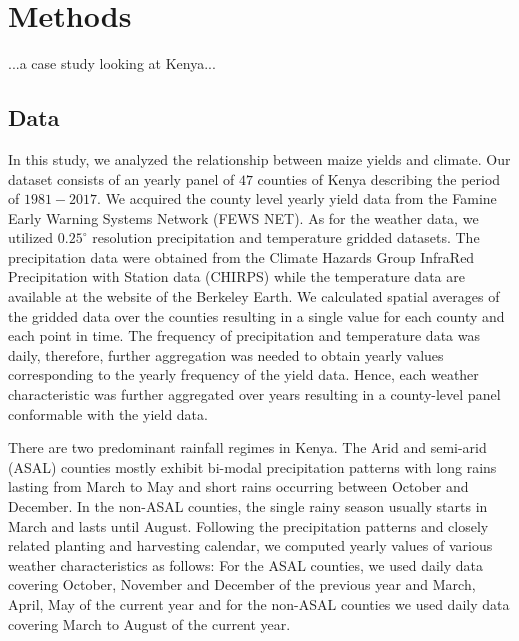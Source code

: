 \documentclass[12pt]{iopart}
\begin{document}
\section{Methods}\label{Methods}
\color{blue}

...a case study looking at Kenya...
\color{black}


 
\subsection{Data}\label{Data}

In this study, we analyzed the relationship between maize yields and climate. Our dataset consists of an yearly panel of $47$ counties of Kenya describing the period of $1981-2017$. 
	We acquired the county level yearly yield data from the Famine Early Warning Systems Network (FEWS NET). As for the weather data, we utilized $0.25^\circ$ resolution precipitation and temperature gridded datasets. The precipitation data were obtained from the Climate Hazards Group InfraRed Precipitation with Station data (CHIRPS) while the temperature data are available at the website of the Berkeley Earth. We calculated spatial averages of the gridded data over the counties resulting in a single value for each county and each point in time. The frequency of precipitation and temperature data was daily, therefore, further aggregation was needed to obtain yearly values corresponding to the yearly frequency of the yield data. Hence, each weather characteristic was further aggregated over years resulting in a county-level panel conformable with the yield data. 
	
	There are two predominant rainfall regimes in Kenya. The Arid and semi-arid (ASAL) counties mostly exhibit bi-modal precipitation patterns with long rains lasting from March to May and short rains occurring between October and December. In the non-ASAL counties, the single rainy season usually starts in March and lasts until August. Following the precipitation patterns and closely related planting and harvesting calendar, we computed yearly values of various weather characteristics as follows: For the ASAL counties, we used daily data covering October, November and December of the previous year and March, April, May of the current year and for the non-ASAL counties we used daily data covering March to August of the current year.
\end{document}
